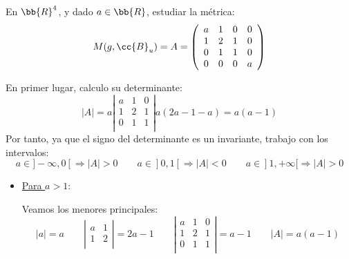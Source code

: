 \begin{ejercicio}
    En $\bb{R}^4$, y dado $a\in \bb{R}$, estudiar la métrica:
    \begin{equation*}
        M(g,\cc{B}_u) = A = \left(\begin{array}{cccc}
            a & 1 & 0 & 0 \\
            1 & 2 & 1 & 0 \\
            0 & 1 & 1 & 0 \\
            0 & 0 & 0 & a \\
        \end{array} \right)
    \end{equation*}

    En primer lugar, calculo su determinante:
    \begin{equation*}
        |A|=a\left|\begin{array}{ccc}
            a & 1 & 0 \\
            1 & 2 & 1 \\
            0 & 1 & 1 \\
        \end{array} \right| a(2a-1-a) = a(a-1)
    \end{equation*}
    Por tanto, ya que el signo del determinante es un invariante, trabajo con los intervalos:
    \begin{equation*}
        a\in ]-\infty,0[\Longrightarrow |A|>0
        \qquad
        a\in ]0,1[ \Longrightarrow |A|<0
        \qquad
        a\in ]1,+\infty[\Longrightarrow |A|>0
    \end{equation*}

    \begin{itemize}
        \item \underline{Para $a>1$}:

        Veamos los menores principales:
        \begin{equation*}
            |a|=a
            \qquad
            \left|\begin{array}{cc}
                a & 1 \\
                1 & 2 \\
            \end{array} \right| = 2a - 1
            \qquad 
            \left|\begin{array}{ccc}
                a & 1 & 0 \\
                1 & 2 & 1 \\
                0 & 1 & 1 \\
            \end{array} \right| = a-1
            \qquad |A|=a(a-1)
        \end{equation*}
        

\end{itemize}
\end{ejercicio}
